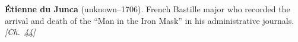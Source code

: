 \textbf{Étienne du Junca} (unknown–1706). French Bastille major who recorded the arrival and death of the ``Man in the Iron Mask'' in his administrative journals. \emph{[Ch.~\hyperref[ch:ironmask]{44}]}

